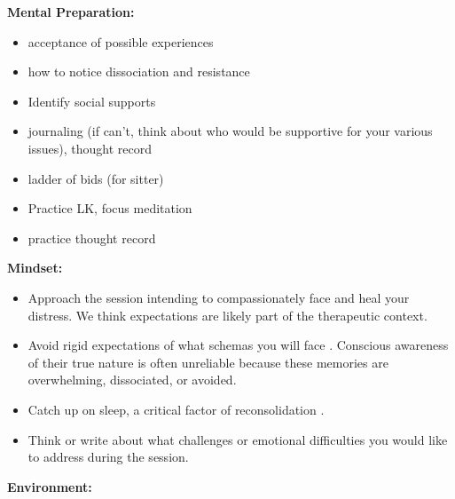 \documentclass[12pt,letterpaper]{article}
\begin{document}
\vspace{\baselineskip}

\noindent \textbf{Mental Preparation:}
\begin{itemize}
    \item acceptance of possible  experiences
    \item how to notice dissociation and resistance
    \item Identify social supports 
    \item journaling (if can't, think about who would be supportive for your various issues), thought record
    \item ladder of bids (for sitter)
    \item Practice LK, focus meditation
    \item practice thought record
\end{itemize}
\noindent \textbf{Mindset:}
\begin{itemize}
    \item Approach the session intending to compassionately face and heal your distress. We think expectations are likely part of the therapeutic context.
    \item Avoid rigid expectations of what schemas you will face \cite{mithoeferManual}. Conscious awareness of their true nature is often unreliable because these memories are overwhelming, dissociated, or avoided.
    \item Catch up on sleep, a critical factor of reconsolidation \cite{walkerSleep}.
    \item Think or write about what challenges or emotional difficulties you would like to address during the session.
\end{itemize}
\noindent \textbf{Environment:}
\end{document}
